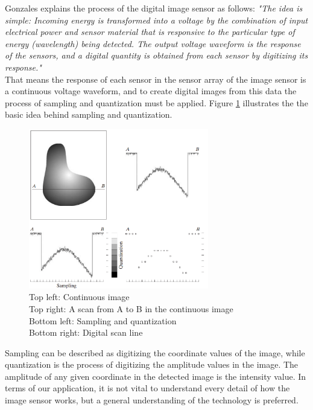 Gonzales explains the process of the digital image sensor as follows: \emph{"The idea is simple: Incoming energy is transformed into a voltage by the combination of input electrical power and sensor material that is responsive to the particular type of energy (wavelength) being detected. The output voltage waveform is the response of the sensors, and a digital quantity is obtained from each sensor by digitizing its response."}\cite{g}\\

That means the response of each sensor in the sensor array of the image sensor is a continuous voltage waveform, and to create digital images from this data the process of sampling and quantization must be applied. Figure \ref{fig:sample} illustrates the the basic idea behind sampling and quantization.
\begin{figure}[h]
  \centering
  \captionsetup{justification=centering}
  \includegraphics[width=0.7\textwidth]{fig/sample}
  \caption{ Top left: Continuous image\\
  Top right: A scan from A to B in the continuous image\\
  Bottom left: Sampling and quantization\\
  Bottom right: Digital scan line \cite{g}}
  \label{fig:sample}
\end{figure}

Sampling can be described as digitizing the coordinate values of the image, while quantization is the process of digitizing the amplitude values in the image. The amplitude of any given coordinate in the detected image is the intensity value. In terms of our application, it is not vital to understand every detail of how the image sensor works, but a general understanding of the technology is preferred.\\

